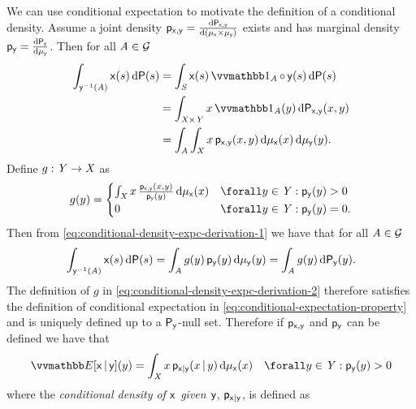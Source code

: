 We can use conditional expectation to motivate the definition of a conditional density. Assume a joint density $\mathsf{p}_{\mathsf{x},\mathsf{y}} = \frac{\mathrm{d} \mathsf{P}_{\mathsf{x},\mathsf{y}}}{\mathrm{d} (\mu_{\mathsf{x}}\times\mu_{\mathsf{y}})}$ exists and has marginal density $\mathsf{p}_{\mathsf{y}} = \frac{\mathrm{d} \mathsf{P}_{\mathsf{y}}}{\mathrm{d} \mu_{\mathsf{y}}}$. Then for all $\mathit{A} \in \mathcal{G}$
\begin{align}
  \int_{\rvar{y}^{-1}(\set{A})} \rvar{x}(s) \, \dr\probability(s) 
    &= \int_{\set{S}} \rvar{x}(s) \ind{\set{A}} \circ \, \rvar{y}(s) \,\dr\probability(s)\\
    &= \int_{\set{X}\times\set{Y}} x \ind{\set{A}}(y) \,\dr\prob{\rvar{x},\rvar{y}}(x,y)\\
    &= \int_{\set{A}} \int_{\set{X}} 
      x \, \pden{\rvar{x},\rvar{y}}(x,y) 
    \,\dr\mu_{\rvar{x}}(x) \,\dr\mu_{\rvar{y}}(y). \label{eq:conditional-density-expc-derivation-1}
\end{align}
Define $g : \mathit{Y} \to \mathit{X}$ as
\begin{equation}\label{eq:conditional-density-expc-derivation-2}
  g(y) = 
  \begin{cases}
    \int_{\set{X}} x \, \frac{\pden{\rvar{x},\rvar{y}}(x,y)}{\pden{\rvar{y}}(y)} \,\dr\mu_{\rvar{x}}(x)
    & \forall y \in \set{Y} : \pden{\rvar{y}}(y) > 0\\
    0 & \forall y \in \set{Y} : \pden{\rvar{y}}(y) = 0.
  \end{cases}
\end{equation}
Then from \eqref{eq:conditional-density-expc-derivation-1} we have that for all $\mathit{A} \in \mathcal{G}$
\begin{equation}
  \int_{\mathsf{y}^{-1}(\mathit{A})} \mathsf{x}(s) \, \mathrm{d}\mathsf{P}(s)
  =
  \int_{\mathit{A}} g(y) \, \mathsf{p}_{\mathsf{y}}(y) \,\mathrm{d}\mu_{\mathsf{y}}(y)
  =
  \int_{\mathit{A}} g(y) \,\mathrm{d}\mathsf{P}_{\mathsf{y}}(y).
\end{equation}
The definition of $g$ in \eqref{eq:conditional-density-expc-derivation-2} therefore satisfies the definition of conditional expectation in \eqref{eq:conditional-expectation-property} and is uniquely defined up to a $\mathsf{P}_{\mathsf{y}}$-null set. Therefore if $\mathsf{p}_{\mathsf{x},\mathsf{y}}$ and $\mathsf{p}_{\mathsf{y}}$ can be defined we have that 
\begin{equation}\label{eq:conditional-expectation-density}
  \expc{\rvar{x}\gvn\rvar{y}}(y) =
  \int_{\set{X}} x\,\pden{\rvar{x}|\rvar{y}}(x\gvn y) \,\dr\mu_{\rvar{x}}(x)
  \quad \forall y \in \set{Y} : \pden{\rvar{y}}(y) > 0
\end{equation}
where the \emph{conditional density of $\mathsf{x}$ given $\mathsf{y}$}, $\mathsf{p}_{\mathsf{x}|\mathsf{y}}$, is defined as
